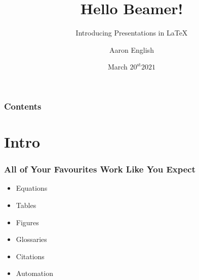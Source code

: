 \documentclass{beamer}
\title{Hello Beamer!}
\subtitle{Introducing Presentations in \LaTeX}
\date{March $20^{\text{st}}  2021$}
\author{Aaron English}
\begin{document}
    \begin{frame}
        \titlepage
    \end{frame}
    \begin{frame}
        \frametitle{Contents}
        \tableofcontents
    \end{frame}
    \section{Intro}\label{sct:intro}
        \begin{frame}
            \frametitle{All of Your Favourites Work Like You Expect}
            \begin{itemize}
                \item Equations
                \item Tables
                \item Figures
                \item Glossaries
                \item Citations
                \item Automation
            \end{itemize}
        \end{frame}
\end{document}
